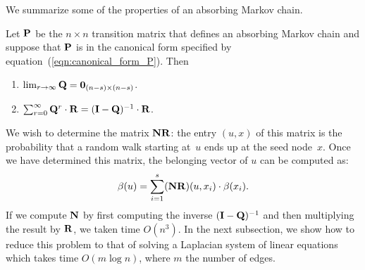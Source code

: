 We summarize some of the properties of an absorbing Markov chain. 
\begin{proposition}\label{prop:limiting_Q}
	Let $\mathbf{P}$ be the $n \times n$ transition matrix that defines an absorbing Markov chain
	and suppose that $\mathbf{P}$ is in the canonical form specified by equation~(\ref{eqn:canonical_form_P}). 
	Then
	\begin{enumerate}
		\item $\lim_{r \to \infty} \mathbf{Q} = \mathbf{0}_{(n - s) \times (n - s)}$.
		\item $\sum_{r = 0}^{\infty} \mathbf{Q}^r \cdot \mathbf{R} = (\mathbf{I} - \mathbf{Q})^{-1} \cdot \mathbf{R}$.
	\end{enumerate} 
\end{proposition}

We wish to determine the matrix $\mathbf{N} \mathbf{R}$: the entry $(u, x)$ of this 
matrix is the probability that a random walk starting at~$u$ ends up at the seed 
node~$x$. Once we have determined this matrix, the belonging vector of $u$ can 
be computed as:
\begin{equation}\label{eqn:belonging_vector}
	\beta(u) = \sum_{i = 1}^{s} (\mathbf{N} \mathbf{R}) (u, x_i) \cdot \beta(x_i).
\end{equation}
If we compute $\mathbf{N}$ by first computing the inverse $(\mathbf{I} - \mathbf{Q})^{-1}$
and then multiplying the result by $\mathbf{R}$, we taken time $O(n^3)$. In the 
next subsection, we show how to reduce this problem to that of solving a 
Laplacian system of linear equations which takes time $O(m \log n)$, where $m$
the number of edges. 
